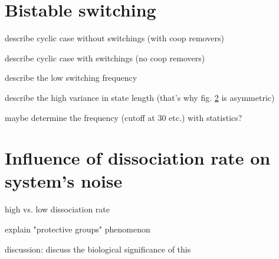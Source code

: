     \section{Bistable switching}
        \label{sec:ResBistableSwitching}
        \begin{figure}[htpb!]
            \centering
            \caption{}
            \label{img:cyclBistability_runPlot1}
        \end{figure}
        \begin{figure}[htpb!]
            \centering
            \caption{}
            \label{img:cyclBistability_runPlot2}
        \end{figure}
        \begin{itemize}
            {
                \color{red}
                \item describe cyclic case without switchings (with coop removers)
                \item describe cyclic case with switchings (no coop removers)
                \item describe the low switching frequency
                \item describe the high variance in state length (that's why fig. \ref{img:cyclBistability_runPlot2} is asymmetric)
                \item maybe determine the frequency (cutoff at 30 etc.) with statistics?
            }
        \end{itemize}
    \newpage
    \section{Influence of dissociation rate on system's noise}
        \label{sec:ResInfluenceDissociationRate}
        \begin{figure}[htpb!]
            \centering
            \caption{}
            \label{img:dissoc_runPlot1}
        \end{figure}
        \begin{figure}[htpb!]
            \centering
            \caption{}
            \label{img:dissoc_runPlot2}
        \end{figure}
        \begin{itemize}
            {
                \color{red}
                \item high vs. low dissociation rate
                \item explain "protective groups" phenomenon
                \item discussion: discuss the biological significance of this
            }
        \end{itemize}
    \newpage
